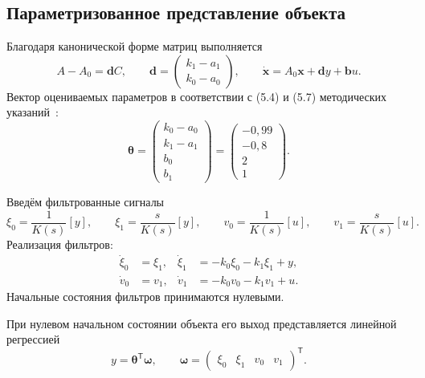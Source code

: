 \subsection{Параметризованное представление объекта}

Благодаря канонической форме матриц выполняется
\begin{equation}
  A-A_0=\bm d C,
  \qquad
  \bm d=\begin{pmatrix}k_1-a_1\\k_0-a_0\end{pmatrix},
  \qquad
  \dot{\bm x}=A_0\bm x+\bm d y+\bm b u.
  \label{eq:matching}
\end{equation}
Вектор оцениваемых параметров в соответствии с (5.4) и (5.7)
методических указаний~\cite{manual}:
\begin{equation}
  \bm\theta=
  \begin{pmatrix}
    k_0-a_0\\k_1-a_1\\b_0\\b_1
  \end{pmatrix}
  =
  \begin{pmatrix}
    -0{,}99\\-0{,}8\\2\\1
  \end{pmatrix}.
  \label{eq:true-parameters}
\end{equation}

Введём фильтрованные сигналы
\begin{equation}
  \xi_0=\frac{1}{K(s)}[y],\qquad
  \xi_1=\frac{s}{K(s)}[y],\qquad
  v_0=\frac{1}{K(s)}[u],\qquad
  v_1=\frac{s}{K(s)}[u].
  \label{eq:filtered-signals}
\end{equation}
Реализация фильтров:
\begin{equation}
  \begin{aligned}
    \dot\xi_0&=\xi_1,
    &\dot\xi_1&=-k_0\xi_0-k_1\xi_1+y,\\
    \dot v_0&=v_1,
    &\dot v_1&=-k_0v_0-k_1v_1+u.
  \end{aligned}
  \label{eq:filter-equations}
\end{equation}
Начальные состояния фильтров принимаются нулевыми.

При нулевом начальном состоянии объекта его выход представляется
линейной регрессией
\begin{equation}
  y=\bm\theta^{\mathsf T}\bm\omega,
  \qquad
  \bm\omega=
  \begin{pmatrix}\xi_0&\xi_1&v_0&v_1\end{pmatrix}^{\mathsf T}.
  \label{eq:output-regression}
\end{equation}
